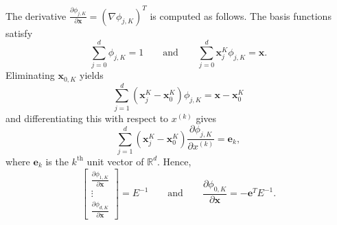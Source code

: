 \documentclass[american]{scrartcl}
\providecommand{\V}[1]{\boldsymbol{#1}}
\providecommand{\p}[2]{\frac{\partial{}#1}{\partial{}#2}}
\providecommand{\R}{\mathbb{R}}
\theoremstyle{remark}
\begin{document}
The derivative $\p{\phi_{j,K}}{\V{x}}  = {\left(\nabla \phi_{j, K}\right)}^T$ is computed as follows.
The basis functions satisfy
\[
   \sum_{j=0}^d \phi_{j,K} = 1
   \qquad \text{and} \qquad
   \sum_{j=0}^d \V{x}_{j}^K \phi_{j, K} = \V{x}
   .
\]
Eliminating $\V{x}_{0, K}$ yields
\[
   \sum_{j=1}^d \left( \V{x}_{j}^K-\V{x}_0^K \right) \phi_{j,K} 
      = \V{x} - \V{x}_0^K
\]
and differentiating this with respect to $x^{(k)}$ gives
\[
   \sum_{j=1}^d (\V{x}_{j}^K-\V{x}_0^K)\p{\phi_{j,K}}{x^{(k)}} 
      = \V{e}_k
   ,
\]
where $\V{e}_k$ is the $k^{\text{th}}$ unit vector of $\R^d$.
Hence,
\begin{equation}
 \begin{bmatrix} \p{\phi_{1,K}}{\V{x}} \\ \vdots \\ \p{\phi_{d,K}}{\V{x}}\end{bmatrix} = E^{-1}
   \qquad \text{and} \qquad
   \p{\phi_{0,K}}{\V{x}} = - \V{e}^T E^{-1}
   .
   \label{eq:x:der:6}
\end{equation}

\printbibliography{}
\end{document}
